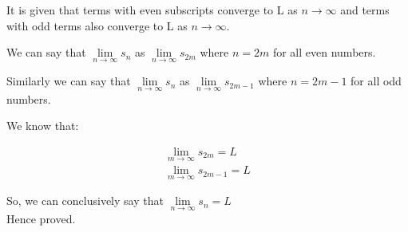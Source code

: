 \documentclass[11pt, letterpaper]{article}
\begin{document}
\begin{enumerate}
{	It is given that terms with even subscripts converge to L as $n \to \infty$ and terms with odd terms also converge to L as $n \to \infty$. 
	
	We can say that $\lim \limits_{n \to \infty} s_n$ as $\lim \limits_{n \to \infty} s_{2m}$ where  $n = 2m$ for all even numbers.
	
	Similarly we can say that $\lim \limits_{n \to \infty} s_n$ as $\lim \limits_{n \to \infty} s_{2m-1}$ where $n = 2m-1$ for all odd numbers.
	
	We know that:
	
	\begin{align*}
		\lim \limits_{m \to \infty} s_{2m} = L\\
		\lim \limits_{m \to \infty} s_{2m-1} = L
	\end{align*}
	
	So, we can conclusively say that $\lim \limits_{n \to \infty} s_n = L$\\
	Hence proved.
}

\end{enumerate}
\clearpage
\end{document}
